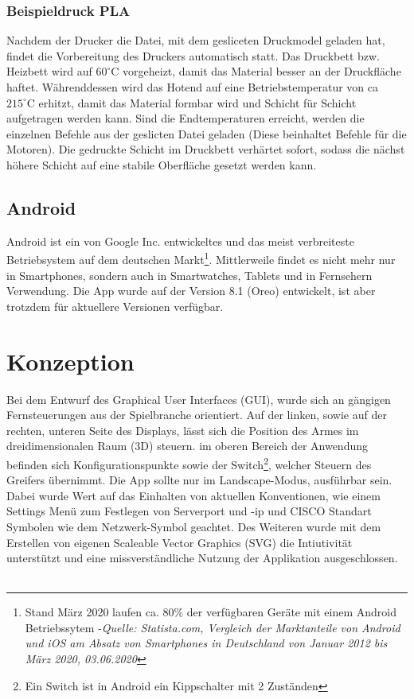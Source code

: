 \documentclass[12pt,					%
							 oneside,			%
							 a4paper,			%
							 halfparskip,		%
							 liststotoc,			%
							 bibtotoc,			%
							 fleqn,				%
							 pointlessnumbers]	%
							 {scrreprt}
\begin{document}
\subsection{Beispieldruck PLA}
Nachdem der Drucker die Datei, mit dem gesliceten Druckmodel geladen hat, findet die Vorbereitung des Druckers automatisch statt.
Das Druckbett bzw. Heizbett wird auf $60^\circ\text{C}$ vorgeheizt, damit das Material besser an der Druckfläche haftet.
Währenddessen wird das Hotend auf eine Betriebstemperatur von ca  $215^\circ\text{C}$ erhitzt, damit das Material formbar wird und Schicht für Schicht aufgetragen werden kann.
Sind die Endtemperaturen erreicht, werden die einzelnen Befehle aus der geslicten Datei geladen (Diese beinhaltet Befehle für die Motoren).
Die gedruckte Schicht im Druckbett verhärtet sofort, sodass die nächst höhere Schicht auf eine stabile Oberfläche gesetzt werden kann.
\section{Android}
Android ist ein von Google Inc. entwickeltes und das meist verbreiteste Betriebsystem auf dem deutschen Markt\footnote{Stand März 2020 laufen ca. 80\% der verfügbaren Geräte mit einem Android Betriebssytem -\textit{Quelle: Statista.com, \glqq{}Vergleich der Marktanteile von Android und iOS am Absatz von Smartphones in Deutschland von Januar 2012 bis März 2020\grqq{}, 03.06.2020}\cite{Tenzer2020}}. Mittlerweile findet es nicht mehr nur in Smartphones, sondern auch in Smartwatches, Tablets und in Fernsehern Verwendung. Die App wurde auf der Version 8.1 (Oreo) entwickelt, ist aber trotzdem für aktuellere Versionen verfügbar.
\chapter{Konzeption}
Bei dem Entwurf des Graphical User Interfaces (GUI), wurde sich an gängigen Fernsteuerungen aus der Spielbranche orientiert. Auf der linken, sowie auf der rechten, unteren Seite des Displays, lässt sich die Position des Armes im dreidimensionalen Raum (3D) steuern. im oberen Bereich der Anwendung befinden sich Konfigurationspunkte sowie der \glqq{}Switch\grqq{}\footnote{Ein Switch ist in Android ein Kippschalter mit 2 Zuständen}, welcher Steuern des Greifers übernimmt. Die App sollte nur im \glqq{}Landscape\grqq{}-Modus, ausführbar sein. Dabei wurde Wert auf das Einhalten von aktuellen Konventionen, wie einem Settings Menü zum Festlegen von Serverport und -ip und CISCO Standart Symbolen wie dem Netzwerk-Symbol geachtet. Des Weiteren wurde mit dem Erstellen von eigenen Scaleable Vector Graphics (SVG) die Intiutivität unterstützt und eine missverständliche Nutzung der Applikation ausgeschlossen.\\ \\
\end{document}
